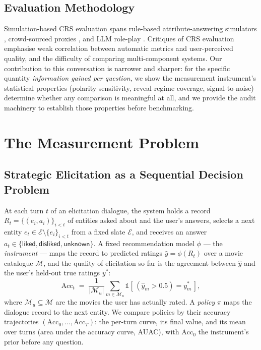 \documentclass[11pt]{article}
\begin{document}
\subsection{Evaluation Methodology}

Simulation-based CRS evaluation spans rule-based attribute-answering
simulators \citep{lei2020estimation, deng2021unified}, crowd-sourced
proxies \citep{sun2018conversational, kang2019recommendation}, and LLM
role-play \citep{wang2023rethinking}. Critiques of CRS evaluation
\citep{jannach2022evaluating} emphasise weak correlation between automatic
metrics and user-perceived quality, and the difficulty of comparing
multi-component systems. Our contribution to this conversation is narrower
and sharper: for the specific quantity \emph{information gained per
question}, we show the measurement instrument's statistical properties
(polarity sensitivity, reveal-regime coverage, signal-to-noise) determine
whether any comparison is meaningful at all, and we provide the audit
machinery to establish those properties before benchmarking.

\section{The Measurement Problem}
\label{sec:problem}

\subsection{Strategic Elicitation as a Sequential Decision Problem}

At each turn $t$ of an elicitation dialogue, the system holds a record
$R_t = \{(e_i, a_i)\}_{i<t}$ of entities asked about and the user's answers,
selects a next entity $e_t \in \mathcal{E} \setminus \{e_i\}_{i<t}$ from a
fixed slate $\mathcal{E}$, and receives an answer
$a_t \in \{\textsf{liked}, \textsf{disliked}, \textsf{unknown}\}$. A fixed
recommendation model $\phi$ --- the \emph{instrument} --- maps the record to
predicted ratings $\hat{y} = \phi(R_t)$ over a movie catalogue
$\mathcal{M}$, and the quality of elicitation so far is the agreement
between $\hat{y}$ and the user's held-out true ratings $y^*$:
\begin{equation}
\mathrm{Acc}_t \;=\; \frac{1}{|\mathcal{M}_u|} \sum_{m \in \mathcal{M}_u}
\mathbb{1}\!\left[\, (\hat{y}_m > 0.5) = y^*_m \,\right],
\label{eq:acc}
\end{equation}
where $\mathcal{M}_u \subseteq \mathcal{M}$ are the movies the user has
actually rated. A \emph{policy} $\pi$ maps the dialogue record to the next
entity. We compare policies by their accuracy trajectories
$(\mathrm{Acc}_0, \ldots, \mathrm{Acc}_T)$: the per-turn curve, its final
value, and its mean over turns (area under the accuracy curve, AUAC), with
$\mathrm{Acc}_0$ the instrument's prior before any question.
\end{document}
